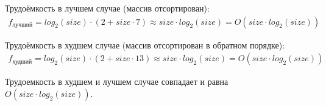 Трудоёмкость в лучшем случае (массив отсортирован):
\begin{equation}
	\begin{multlined}
		f_{\text{лучший}} = log_2(size) \cdot (2 + size \cdot 7) \approx  size \cdot log_2(size) = O(size \cdot log_2(size))  
	\end{multlined}
\end{equation}

Трудоёмкость в худшем случае (массив отсортирован в обратном порядке):
\begin{equation}
	\begin{multlined}
		f_{\text{худший}} = log_2(size) \cdot (2 + size \cdot 13) \approx  size \cdot log_2(size) = O(size \cdot log_2(size))             
	\end{multlined}
\end{equation}

Трудоемкость в худшем и лучшем случае совпадает и равна $O(size \cdot log_2(size))$.
